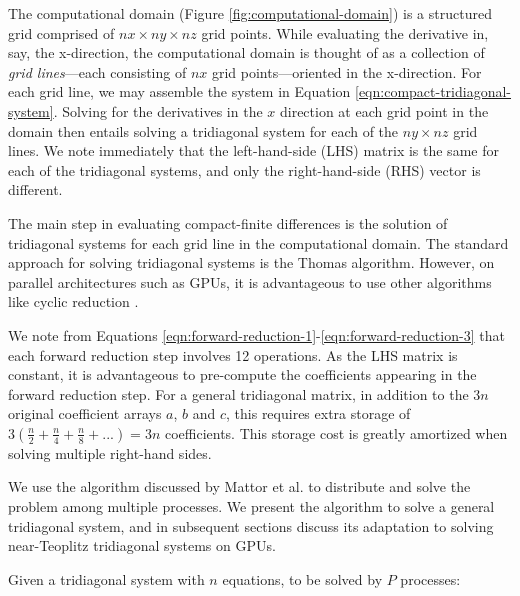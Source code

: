 The computational domain (Figure \ref{fig:computational-domain})
is a structured grid comprised of $nx \times ny \times nz$ grid points.
While evaluating the derivative in, say, the x-direction,
the computational domain is thought of as
a collection of \emph{grid lines}---each consisting of
$nx$ grid points---oriented in the x-direction.
For each grid line, we may assemble the system in
Equation \ref{eqn:compact-tridiagonal-system}.
Solving for the derivatives in the $x$ direction
at each grid point in the domain then entails
solving a tridiagonal system for each of the $ny \times nz$ grid lines.
We note immediately that the left-hand-side (LHS) matrix
is the same for each of the tridiagonal systems,
and only the right-hand-side (RHS) vector is different.


The main step in evaluating compact-finite differences is the
solution of tridiagonal systems
for each grid line in the computational domain.
The standard approach for solving tridiagonal systems is
the Thomas algorithm.
However, on parallel architectures such as GPUs,
it is advantageous to use other algorithms like
cyclic reduction \cite{Zhang2010FTS}.




We note from
Equations \ref{eqn:forward-reduction-1}-\ref{eqn:forward-reduction-3}
that each forward reduction step involves 12 operations.
As the LHS matrix is constant,
it is advantageous to pre-compute the coefficients appearing
in the forward reduction step.
For a general tridiagonal matrix,
in addition to the $3n$ original coefficient arrays
$a$, $b$ and $c$,
this requires extra storage of 
$3(\frac{n}{2}+\frac{n}{4}+\frac{n}{8}+...)=3n$
coefficients.
This storage cost is greatly amortized
when solving multiple right-hand sides.

We use the algorithm discussed by Mattor et al.
\cite{mattor1995algorithm}
to distribute and solve the problem among multiple processes. 
We present the algorithm to solve a general tridiagonal system,
and in subsequent sections discuss its adaptation to solving
near-Teoplitz tridiagonal systems on GPUs.

Given a tridiagonal system with  $n$ equations,
to be solved by $P$ processes:

